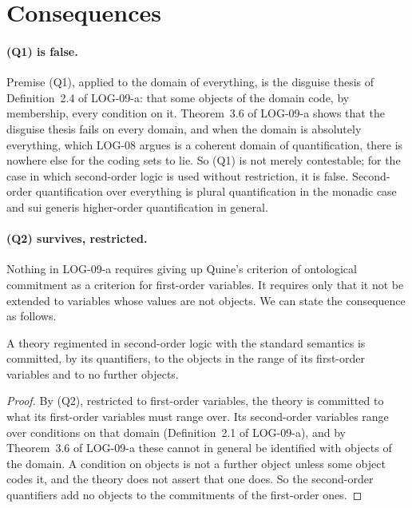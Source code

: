 \documentclass{situationist-preprint}
\begin{document}
\section{Consequences}

\paragraph{(Q1) is false.} Premise (Q1), applied to the domain of everything, is the disguise thesis of Definition~2.4 of LOG-09-a: that some objects of the domain code, by membership, every condition on it. Theorem~3.6 of LOG-09-a shows that the disguise thesis fails on every domain, and when the domain is absolutely everything, which LOG-08 argues is a coherent domain of quantification, there is nowhere else for the coding sets to lie. So (Q1) is not merely contestable; for the case in which second-order logic is used without restriction, it is false. Second-order quantification over everything is plural quantification in the monadic case \citep{Boolos1984} and sui generis higher-order quantification in general.

\paragraph{(Q2) survives, restricted.} Nothing in LOG-09-a requires giving up Quine's criterion of ontological commitment as a criterion for first-order variables. It requires only that it not be extended to variables whose values are not objects. We can state the consequence as follows.

\begin{proposition}\label{p:commit}
A theory regimented in second-order logic with the standard semantics is committed, by its quantifiers, to the objects in the range of its first-order variables and to no further objects.
\end{proposition}

\begin{proof}
By (Q2), restricted to first-order variables, the theory is committed to what its first-order variables must range over. Its second-order variables range over conditions on that domain (Definition~2.1 of LOG-09-a), and by Theorem~3.6 of LOG-09-a these cannot in general be identified with objects of the domain. A condition on objects is not a further object unless some object codes it, and the theory does not assert that one does. So the second-order quantifiers add no objects to the commitments of the first-order ones.
\end{proof}
\end{document}
